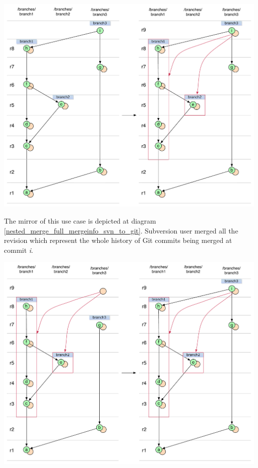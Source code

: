 \begin{center}
\includegraphics[width=\textwidth]{img/diagrams/nested_merge_full_mergeinfo_git_to_svn.pdf}%
\label{nested_merge_full_mergeinfo_git_to_svn}%
\end{center}

The mirror of this use case is depicted at diagram \ref{nested_merge_full_mergeinfo_svn_to_git}. Subversion user merged all the revision which represent the whole history of Git commits being merged at commit \emph{i}.

\begin{center}
\includegraphics[width=\textwidth]{img/diagrams/nested_merge_full_mergeinfo_svn_to_git.pdf}%
\label{nested_merge_full_mergeinfo_svn_to_git}%
\end{center}


